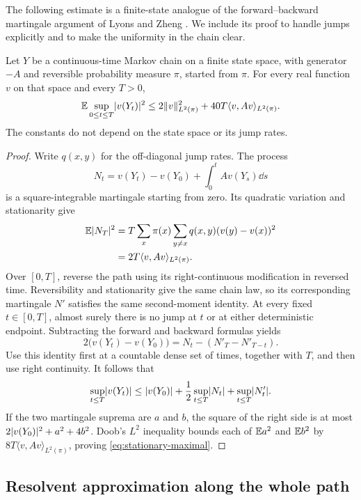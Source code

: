 The following estimate is a finite-state analogue of the forward--backward
martingale argument of Lyons and Zheng \cite{LyonsZheng1988}.
We include its proof to handle jumps explicitly and to make the uniformity
in the chain clear.

\begin{lemma}\label{lem:stationary-maximal}
Let $Y$ be a continuous-time Markov chain on a finite state space, with
generator $-A$ and reversible probability measure $\pi$, started from $\pi$.
For every real function $v$ on that space and every $T>0$,
\begin{equation}\label{eq:stationary-maximal}
 \mathbb E\sup_{0\le t\le T}\lvert v(Y_t)\rvert^2
 \le 2\lVert v\rVert_{L^2(\pi)}^2+40T\langle v,Av\rangle_{L^2(\pi)}.
\end{equation}
The constants do not depend on the state space or its jump rates.
\end{lemma}

\begin{proof}
Write $q(x,y)$ for the off-diagonal jump rates. The process
\[
 N_t=v(Y_t)-v(Y_0)+\int_0^t Av(Y_s)\dd s
\]
is a square-integrable martingale starting from zero. Its quadratic variation
and stationarity give
\begin{align*}
 \mathbb E\lvert N_T\rvert^2
 &=T\sum_x\pi(x)\sum_{y\ne x}q(x,y)(v(y)-v(x))^2\\
 &=2T\langle v,Av\rangle_{L^2(\pi)}.
\end{align*}
Over $[0,T]$, reverse the path using its right-continuous modification in
reversed time. Reversibility and stationarity give the same chain law, so its
corresponding martingale $N'$ satisfies the same second-moment identity.
At every fixed $t\in[0,T]$, almost surely there is no jump at $t$ or at either
deterministic endpoint. Subtracting the forward and backward formulas yields
\[
 2\bigl(v(Y_t)-v(Y_0)\bigr)=N_t-(N'_T-N'_{T-t}).
\]
Use this identity first at a countable dense set of times, together with
$T$, and then use right continuity. It follows that
\[
 \sup_{t\le T}\lvert v(Y_t)\rvert
 \le \lvert v(Y_0)\rvert+\frac12\sup_{t\le T}\lvert N_t\rvert
                       +\sup_{t\le T}\lvert N'_t\rvert.
\]
If the two martingale suprema are $a$ and $b$, the square of the right side is
at most $2\lvert v(Y_0)\rvert^2+a^2+4b^2$. Doob's $L^2$ inequality bounds each of
$\mathbb E a^2$ and $\mathbb E b^2$ by
$8T\langle v,Av\rangle_{L^2(\pi)}$, proving
\eqref{eq:stationary-maximal}.
\end{proof}

\subsection{Resolvent approximation along the whole path}

